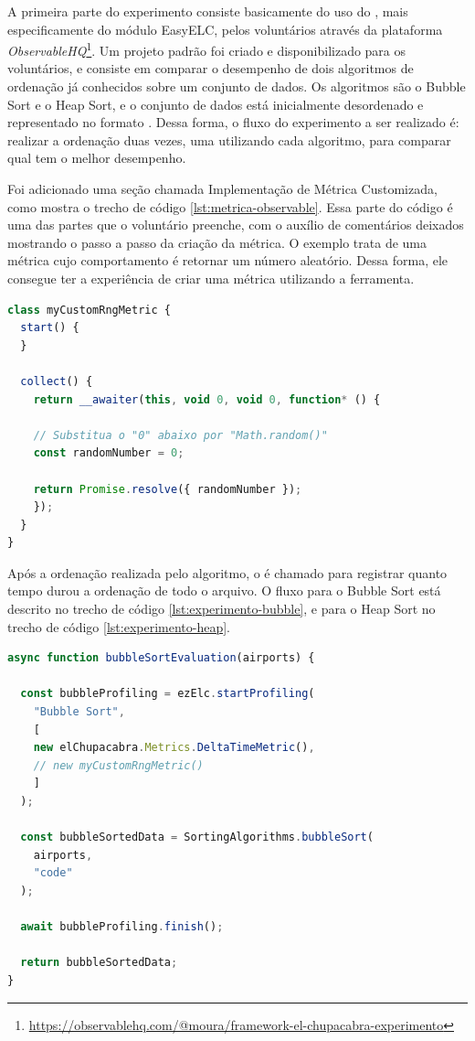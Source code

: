 \documentclass[12pt]{tcc}
\begin{document}


	A primeira parte do experimento consiste basicamente do uso do , mais especificamente do módulo EasyELC, pelos voluntários através da plataforma \emph{ObservableHQ}\footnote{\url{https://observablehq.com/@moura/framework-el-chupacabra-experimento}}. Um projeto padrão foi criado e disponibilizado para os voluntários, e consiste em comparar o desempenho de dois algoritmos de ordenação já conhecidos sobre um conjunto de dados. Os algoritmos são o Bubble Sort e o Heap Sort, e o conjunto de dados está inicialmente desordenado e representado no formato . Dessa forma, o fluxo do experimento a ser realizado é: realizar a ordenação duas vezes, uma utilizando cada algoritmo, para comparar qual tem o melhor desempenho.

	Foi adicionado uma seção chamada Implementação de Métrica Customizada, como mostra o trecho de código \ref{lst:metrica-observable}. Essa parte do código é uma das partes que o voluntário preenche, com o auxílio de comentários deixados mostrando o passo a passo da criação da métrica. O exemplo trata de uma métrica cujo comportamento é retornar um número aleatório. Dessa forma, ele consegue ter a experiência de criar uma métrica utilizando a ferramenta.


\begin{lstlisting}[label={lst:metrica-observable}, caption={Seção para criação de métrica customizada pelo usuário no experimento.}, language=TypeScript, breaklines=true]
class myCustomRngMetric {
  start() {
  }

  collect() {
    return __awaiter(this, void 0, void 0, function* () {

    // Substitua o "0" abaixo por "Math.random()"
    const randomNumber = 0;

    return Promise.resolve({ randomNumber });
    });
  }
}
\end{lstlisting}


	Após a ordenação realizada pelo algoritmo, o  é chamado para registrar quanto tempo durou a ordenação de todo o arquivo. O fluxo para o Bubble Sort está descrito no trecho de código \ref{lst:experimento-bubble}, e para o Heap Sort no trecho de código \ref{lst:experimento-heap}.


\begin{lstlisting}[label={lst:experimento-bubble}, caption={Fluxo de código referente a execução da ordenação com o Bubble Sort.}, language=TypeScript, breaklines=true]
async function bubbleSortEvaluation(airports) {

  const bubbleProfiling = ezElc.startProfiling(
    "Bubble Sort",
    [
    new elChupacabra.Metrics.DeltaTimeMetric(),
    // new myCustomRngMetric()
    ]
  );

  const bubbleSortedData = SortingAlgorithms.bubbleSort(
    airports,
    "code"
  );

  await bubbleProfiling.finish();
    
  return bubbleSortedData;
}
\end{lstlisting}
\end{document}
